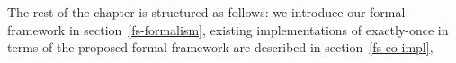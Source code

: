 The rest of the chapter is structured as follows: 
we introduce our formal framework in section~\ref{fs-formalism}, 
existing implementations of exactly-once in terms of the proposed formal framework are described in section~\ref{fs-eo-impl}, 
